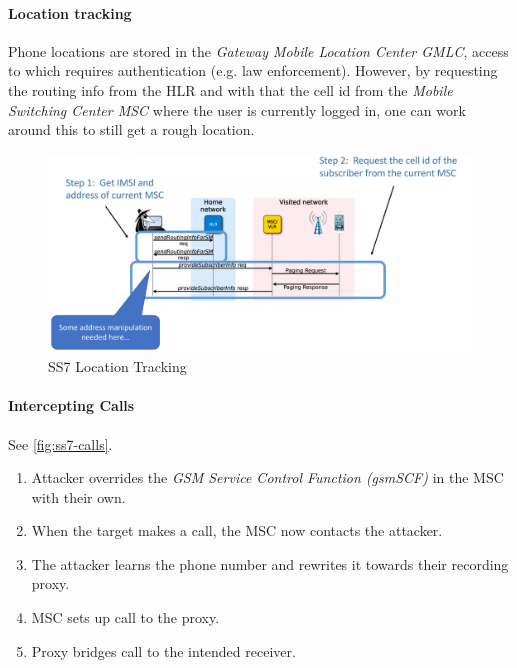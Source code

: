 \paragraph{Location tracking}
Phone locations are stored in the \textit{Gateway Mobile Location Center GMLC},
access to which requires authentication (e.g. law enforcement). However, by
requesting the routing info from the HLR and with that the cell id from the
\textit{Mobile Switching Center MSC} where the user is currently logged in, one
can work around this to still get a rough location.

\begin{figure}[h]
	\centering
	\includegraphics[scale=0.4]{images/10-ss7-location.png}
	\caption{SS7 Location Tracking}
	\label{fig:ss7-location}
\end{figure}

\paragraph{Intercepting Calls}
See \autoref{fig:ss7-calls}.
\begin{enumerate}
	\item Attacker overrides the \textit{GSM Service Control Function (gsmSCF)} in the
	      MSC with their own.
	\item When the target makes a call, the MSC now contacts the attacker.
	\item The attacker learns the phone number and rewrites it towards their recording
	      proxy.
	\item MSC sets up call to the proxy.
	\item Proxy bridges call to the intended receiver.
\end{enumerate}

